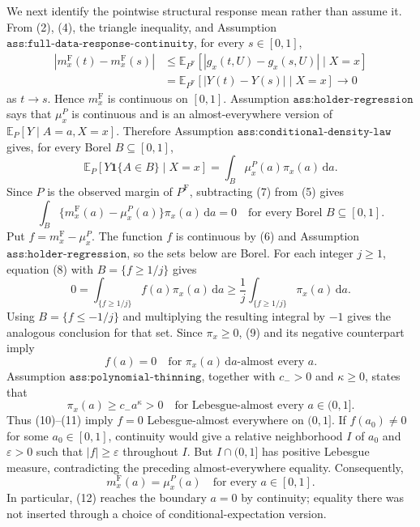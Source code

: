 We next identify the pointwise structural response mean rather than assume it. From (2), (4), the triangle inequality, and Assumption \(\texttt{ass:full-data-response-continuity}\), for every \(s\in[0,1]\),
\[
\begin{aligned}
 |m_x^{\mathrm F}(t)-m_x^{\mathrm F}(s)|
 &\leq \mathbb E_{P^{\mathrm F}}
   [|g_x(t,U)-g_x(s,U)|\mid X=x]\\
 &=\mathbb E_{P^{\mathrm F}}
   [|Y(t)-Y(s)|\mid X=x]
 \longrightarrow0
\end{aligned}
\tag{6}
\]
as \(t\to s\). Hence \(m_x^{\mathrm F}\) is continuous on \([0,1]\). Assumption \(\texttt{ass:holder-regression}\) says that \(\mu_x^P\) is continuous and is an almost-everywhere version of \(\mathbb E_P[Y\mid A=a,X=x]\). Therefore Assumption \(\texttt{ass:conditional-density-law}\) gives, for every Borel \(B\subseteq[0,1]\),
\[
 \mathbb E_P[Y\mathbf 1\{A\in B\}\mid X=x]
 =\int_B\mu_x^P(a)\pi_x(a)\,\mathrm da.
 \tag{7}
\]
Since \(P\) is the observed margin of \(P^{\mathrm F}\), subtracting (7) from (5) gives
\[
 \int_B\{m_x^{\mathrm F}(a)-\mu_x^P(a)\}\pi_x(a)\,\mathrm da=0
 \quad\text{for every Borel }B\subseteq[0,1].
 \tag{8}
\]
Put \(f=m_x^{\mathrm F}-\mu_x^P\). The function \(f\) is continuous by (6) and Assumption \(\texttt{ass:holder-regression}\), so the sets below are Borel. For each integer \(j\geq1\), equation (8) with \(B=\{f\geq1/j\}\) gives
\[
 0=\int_{\{f\geq1/j\}}f(a)\pi_x(a)\,\mathrm da
 \geq \frac1j\int_{\{f\geq1/j\}}\pi_x(a)\,\mathrm da.
 \tag{9}
\]
Using \(B=\{f\leq-1/j\}\) and multiplying the resulting integral by \(-1\) gives the analogous conclusion for that set. Since \(\pi_x\geq0\), (9) and its negative counterpart imply
\[
 f(a)=0
 \quad\text{for }\pi_x(a)\,\mathrm da\text{-almost every }a.
 \tag{10}
\]
Assumption \(\texttt{ass:polynomial-thinning}\), together with \(c_->0\) and \(\kappa\geq0\), states that
\[
 \pi_x(a)\geq c_-a^\kappa>0
 \quad\text{for Lebesgue-almost every }a\in(0,1].
 \tag{11}
\]
Thus (10)--(11) imply \(f=0\) Lebesgue-almost everywhere on \((0,1]\). If \(f(a_0)\neq0\) for some \(a_0\in[0,1]\), continuity would give a relative neighborhood \(I\) of \(a_0\) and \(\varepsilon>0\) such that \(|f|\geq\varepsilon\) throughout \(I\). But \(I\cap(0,1]\) has positive Lebesgue measure, contradicting the preceding almost-everywhere equality. Consequently,
\[
 m_x^{\mathrm F}(a)=\mu_x^P(a)
 \quad\text{for every }a\in[0,1].
 \tag{12}
\]
In particular, (12) reaches the boundary \(a=0\) by continuity; equality there was not inserted through a choice of conditional-expectation version.

